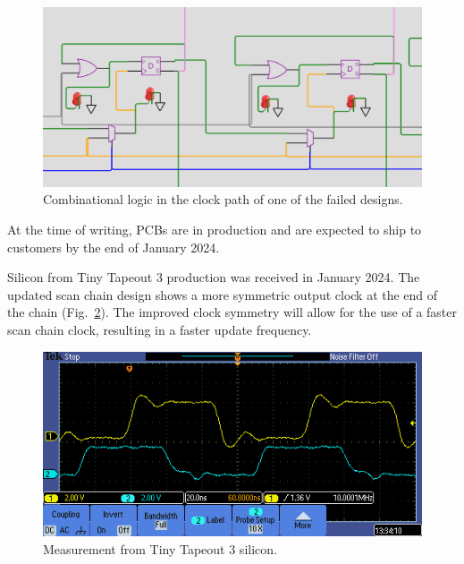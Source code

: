 \begin{figure}[!t]
\centering
\includegraphics[width=\columnwidth]{./Figs/wokwi mux clock logic.png}
\caption{Combinational logic in the clock path of one of the failed designs.}
\label{fig:failed_design_comb_logic}
\end{figure}

At the time of writing, PCBs are in production and are expected to ship to customers by the end of January 2024.

Silicon from Tiny Tapeout 3 production was received in January 2024. The updated scan chain design shows a more symmetric output clock at the end of the chain (Fig.~\ref{fig:TT03_silicon_measurement}). The improved clock symmetry will allow for the use of a faster scan chain clock, resulting in a faster update frequency.

\begin{figure}[!t]
\centering
\includegraphics[width=\columnwidth]{./Figs/tt03_clock_out.png}
\caption{Measurement from Tiny Tapeout 3 silicon.}
\label{fig:TT03_silicon_measurement}
\end{figure}
